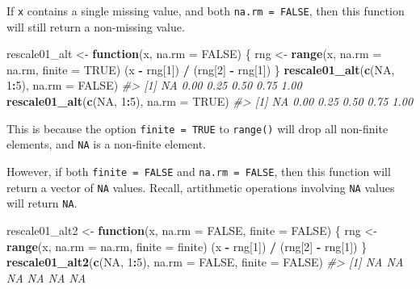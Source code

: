 \documentclass[]{book}
\newenvironment{Shaded}{\begin{snugshade}}{\end{snugshade}}
\newcommand{\CommentTok}[1]{\textcolor[rgb]{0.56,0.35,0.01}{\textit{#1}}}
\newcommand{\ControlFlowTok}[1]{\textcolor[rgb]{0.13,0.29,0.53}{\textbf{#1}}}
\newcommand{\DataTypeTok}[1]{\textcolor[rgb]{0.13,0.29,0.53}{#1}}
\newcommand{\DecValTok}[1]{\textcolor[rgb]{0.00,0.00,0.81}{#1}}
\newcommand{\KeywordTok}[1]{\textcolor[rgb]{0.13,0.29,0.53}{\textbf{#1}}}
\newcommand{\NormalTok}[1]{#1}
\newcommand{\OperatorTok}[1]{\textcolor[rgb]{0.81,0.36,0.00}{\textbf{#1}}}
\newcommand{\OtherTok}[1]{\textcolor[rgb]{0.56,0.35,0.01}{#1}}
\newcommand{\StringTok}[1]{\textcolor[rgb]{0.31,0.60,0.02}{#1}}
\theoremstyle{plain}
\theoremstyle{remark}
\begin{document}
If \texttt{x} contains a single missing value, and both
\texttt{na.rm\ =\ FALSE}, then this function will still return a
non-missing value.

\begin{Shaded}
\begin{Highlighting}[]
\NormalTok{rescale01_alt <-}\StringTok{ }\ControlFlowTok{function}\NormalTok{(x, }\DataTypeTok{na.rm =} \OtherTok{FALSE}\NormalTok{) \{}
\NormalTok{  rng <-}\StringTok{ }\KeywordTok{range}\NormalTok{(x, }\DataTypeTok{na.rm =}\NormalTok{ na.rm, }\DataTypeTok{finite =} \OtherTok{TRUE}\NormalTok{)}
\NormalTok{  (x }\OperatorTok{-}\StringTok{ }\NormalTok{rng[}\DecValTok{1}\NormalTok{]) }\OperatorTok{/}\StringTok{ }\NormalTok{(rng[}\DecValTok{2}\NormalTok{] }\OperatorTok{-}\StringTok{ }\NormalTok{rng[}\DecValTok{1}\NormalTok{])}
\NormalTok{\}}
\KeywordTok{rescale01_alt}\NormalTok{(}\KeywordTok{c}\NormalTok{(}\OtherTok{NA}\NormalTok{, }\DecValTok{1}\OperatorTok{:}\DecValTok{5}\NormalTok{), }\DataTypeTok{na.rm =} \OtherTok{FALSE}\NormalTok{)}
\CommentTok{#> [1]   NA 0.00 0.25 0.50 0.75 1.00}
\KeywordTok{rescale01_alt}\NormalTok{(}\KeywordTok{c}\NormalTok{(}\OtherTok{NA}\NormalTok{, }\DecValTok{1}\OperatorTok{:}\DecValTok{5}\NormalTok{), }\DataTypeTok{na.rm =} \OtherTok{TRUE}\NormalTok{)}
\CommentTok{#> [1]   NA 0.00 0.25 0.50 0.75 1.00}
\end{Highlighting}
\end{Shaded}

This is because the option \texttt{finite\ =\ TRUE} to \texttt{range()}
will drop all non-finite elements, and \texttt{NA} is a non-finite
element.

However, if both \texttt{finite\ =\ FALSE} and \texttt{na.rm\ =\ FALSE},
then this function will return a vector of \texttt{NA} values. Recall,
artithmetic operations involving \texttt{NA} values will return
\texttt{NA}.

\begin{Shaded}
\begin{Highlighting}[]
\NormalTok{rescale01_alt2 <-}\StringTok{ }\ControlFlowTok{function}\NormalTok{(x, }\DataTypeTok{na.rm =} \OtherTok{FALSE}\NormalTok{, }\DataTypeTok{finite =} \OtherTok{FALSE}\NormalTok{) \{}
\NormalTok{  rng <-}\StringTok{ }\KeywordTok{range}\NormalTok{(x, }\DataTypeTok{na.rm =}\NormalTok{ na.rm, }\DataTypeTok{finite =}\NormalTok{ finite)}
\NormalTok{  (x }\OperatorTok{-}\StringTok{ }\NormalTok{rng[}\DecValTok{1}\NormalTok{]) }\OperatorTok{/}\StringTok{ }\NormalTok{(rng[}\DecValTok{2}\NormalTok{] }\OperatorTok{-}\StringTok{ }\NormalTok{rng[}\DecValTok{1}\NormalTok{])}
\NormalTok{\}}
\KeywordTok{rescale01_alt2}\NormalTok{(}\KeywordTok{c}\NormalTok{(}\OtherTok{NA}\NormalTok{, }\DecValTok{1}\OperatorTok{:}\DecValTok{5}\NormalTok{), }\DataTypeTok{na.rm =} \OtherTok{FALSE}\NormalTok{, }\DataTypeTok{finite =} \OtherTok{FALSE}\NormalTok{)}
\CommentTok{#> [1] NA NA NA NA NA NA}
\end{Highlighting}
\end{Shaded}
\end{document}
